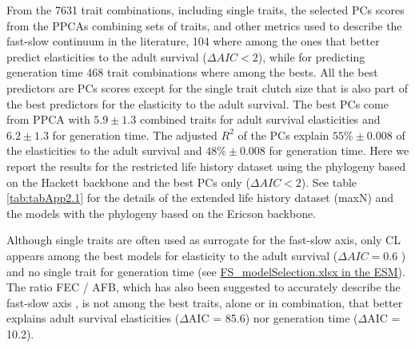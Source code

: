 From the 7631 trait combinations, including single traits, the selected PCs 
scores from the PPCAs combining sets of traits, and other metrics used to 
describe the fast-slow continuum in the literature, 104 where among 
the ones that better predict elasticities to the adult survival
($\Delta AIC < 2$), while for predicting generation time 468 trait combinations
where among the bests. All the best predictors are PCs scores except for the
single trait clutch size that is also part of the best predictors for the
elasticity to the adult survival.
The best PCs come from PPCA with $5.9 \pm 1.3$ combined traits for adult 
survival elasticities and $6.2 \pm 1.3$ for generation time. The adjusted $R^2$
of the PCs explain $55\% \pm 0.008$ of the elasticities to the adult survival
and $48\% \pm 0.008$ for generation time. Here we report the results for the
restricted life history dataset using the phylogeny based on the Hackett
backbone and the best PCs only ($\Delta AIC < 2$). See table
\ref{tab:tabApp2.1} for the details of the extended life history dataset (maxN)
and the models with the phylogeny based on the Ericson backbone.

Although single traits are often used as surrogate for the fast-slow axis, only
CL appears among the best models for elasticity to the adult survival ($\Delta
AIC = 0.6$ ) and no single trait for generation time (see
\href{https://github.com/jmaspons/Thesis/tree/master/ESM/chapter02}{
FS\_modelSelection.xlsx in the ESM}). The ratio FEC / AFB, which has also been
suggested to accurately describe the fast-slow axis \citep{Oli2004}⁠, is not
among the best traits, alone or in combination, that better explains adult
survival elasticities ($\Delta$AIC = 85.6) nor generation time ($\Delta$AIC =
10.2).

